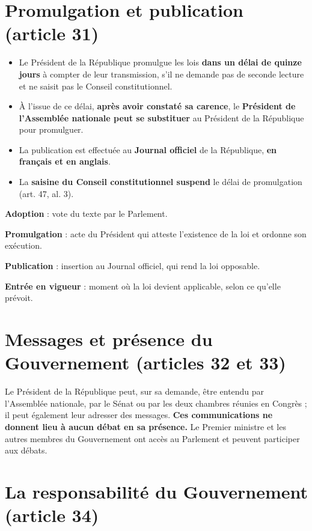 \documentclass[11pt,a4paper,oneside]{report}
\begin{document}
\section{Promulgation et publication (article 31)}
\begin{itemize}
  \item Le Président de la République promulgue les lois \textbf{dans un délai de quinze jours} à compter de leur transmission, s'il ne demande pas de seconde lecture et ne saisit pas le Conseil constitutionnel.
  \item À l'issue de ce délai, \textbf{après avoir constaté sa carence}, le \textbf{Président de l'Assemblée nationale peut se substituer} au Président de la République pour promulguer.
  \item La publication est effectuée au \textbf{Journal officiel} de la République, \textbf{en français et en anglais}.
  \item La \textbf{saisine du Conseil constitutionnel suspend} le délai de promulgation (art. 47, al. 3).
\end{itemize}
\begin{defbox}[title={Définition — Quatre mots à ne pas confondre}]
\textbf{Adoption} : vote du texte par le Parlement.

\textbf{Promulgation} : acte du Président qui atteste l'existence de la loi et ordonne son exécution.

\textbf{Publication} : insertion au Journal officiel, qui rend la loi opposable.

\textbf{Entrée en vigueur} : moment où la loi devient applicable, selon ce qu'elle prévoit.
\end{defbox}
\section{Messages et présence du Gouvernement (articles 32 et 33)}
Le Président de la République peut, sur sa demande, être entendu par l'Assemblée nationale, par le Sénat ou par les deux chambres réunies en Congrès ; il peut également leur adresser des messages. \textbf{Ces communications ne donnent lieu à aucun débat en sa présence.} Le Premier ministre et les autres membres du Gouvernement ont accès au Parlement et peuvent participer aux débats.

\section{La responsabilité du Gouvernement (article 34)}
\end{document}
